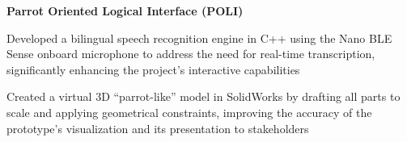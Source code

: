     \vspace{0.2 cm}
    
    \begin{twocolentry}{}
        \textbf{Parrot Oriented Logical Interface (POLI)}
    \end{twocolentry}

    \vspace{0.10 cm}
    \begin{onecolentry}
        \begin{highlights}
            \item Developed a bilingual speech recognition engine in C++ using the Nano BLE Sense onboard microphone to address the need for real-time transcription, significantly enhancing the project’s interactive capabilities
            \item Created a virtual 3D “parrot-like” model in SolidWorks by drafting all parts to scale and applying geometrical constraints, improving the accuracy of the prototype’s visualization and its presentation to stakeholders
        \end{highlights}
    \end{onecolentry}